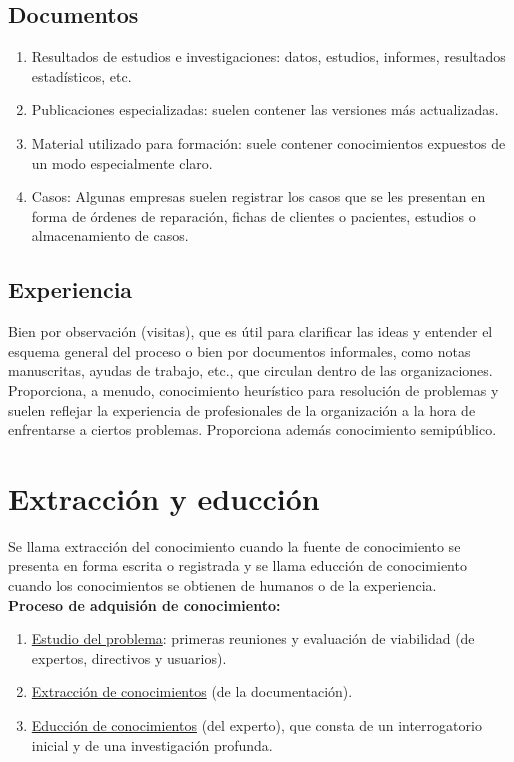 \documentclass[12pt]{article}
\begin{document}
\subsection{Documentos}
\begin{enumerate}
\item Resultados de estudios e investigaciones: datos, estudios, informes, resultados estadísticos, etc.
\item Publicaciones especializadas: suelen contener las versiones más actualizadas.
\item Material utilizado para formación: suele contener conocimientos expuestos de un modo especialmente claro.
\item Casos: Algunas empresas suelen registrar los casos que se les presentan en forma de órdenes de reparación, fichas de clientes o pacientes, estudios o almacenamiento de casos.
\end{enumerate}

\subsection{Experiencia}
Bien por observación (visitas), que es útil para clarificar las ideas y entender el esquema general del proceso o bien por documentos informales, como notas manuscritas, ayudas de trabajo, etc., que circulan dentro de las organizaciones. Proporciona, a menudo, conocimiento heurístico para resolución de problemas y suelen reflejar la experiencia de profesionales de la organización a la hora de enfrentarse a ciertos problemas. Proporciona además  conocimiento semipúblico.

\section{Extracción y educción}
Se llama extracción del conocimiento cuando la fuente de conocimiento se presenta en forma escrita o registrada y se llama educción de conocimiento cuando los conocimientos se obtienen de humanos o de la experiencia. \\ 

\textbf{Proceso de adquisión de conocimiento:}
\begin{enumerate}
\item \underline{Estudio del problema}: primeras reuniones y evaluación de viabilidad (de expertos, directivos y usuarios).
\item \underline{Extracción de conocimientos} (de la documentación).
\item \underline{Educción de conocimientos} (del experto), que consta de un interrogatorio inicial y de una investigación profunda.
\end{enumerate}
\end{document}
